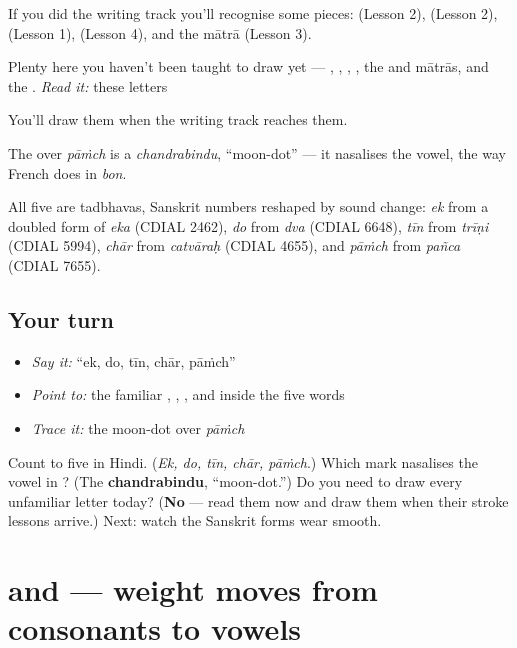 If you did the writing track you'll recognise some pieces: \textbf{} (Lesson 2), \textbf{} (Lesson 2), \textbf{} (Lesson 1), \textbf{} (Lesson 4), and the \textbf{} mātrā (Lesson 3).

Plenty here you haven't been taught to draw yet — \textbf{}, \textbf{}, \textbf{}, \textbf{}, the \textbf{} and \textbf{} mātrās, and the \textbf{}. \emph{Read it:} these letters

You'll draw them when the writing track reaches them.

The \textbf{} over \emph{pāṁch} is a \emph{chandrabindu}, \textquotedblleft{}moon-dot\textquotedblright{} — it nasalises the vowel, the way French does in \emph{bon}.

\begin{cousinweb}
All five are tadbhavas, Sanskrit numbers reshaped by sound change: \emph{ek} from a doubled form of \emph{eka} (CDIAL 2462), \emph{do} from \emph{dva} (CDIAL 6648), \emph{tīn} from \emph{trīṇi} (CDIAL 5994), \emph{chār} from \emph{catvāraḥ} (CDIAL 4655), and \emph{pāṁch} from \emph{pañca} (CDIAL 7655).
\end{cousinweb}

\subsection*{Your turn}
\begin{itemize}
\raggedright
  \item \emph{Say it:} \textquotedblleft{}ek, do, tīn, chār, pāṁch\textquotedblright{}
  \item \emph{Point to:} the familiar , , ,  and  inside the five words
  \item \emph{Trace it:} the \textbf{} moon-dot over \emph{pāṁch}
\end{itemize}

\begin{tcolorbox}[breakable,colback=teal!4,colframe=teal!35!black,title={Before you move on}]
Count to five in Hindi. (\emph{Ek, do, tīn, chār, pāṁch}.) Which mark nasalises the vowel in \textbf{}? (The \textbf{chandrabindu}, \textquotedblleft{}moon-dot.\textquotedblright{}) Do you need to draw every unfamiliar letter today? (\textbf{No} — read them now and draw them when their stroke lessons arrive.) Next: watch the Sanskrit forms wear smooth.
\end{tcolorbox}
\section[\texorpdfstring{\hi{तीन}, \hi{चार} (tīn, chār)}{तीन, चार (tīn, chār)}]{ and  — weight moves from consonants to vowels}

